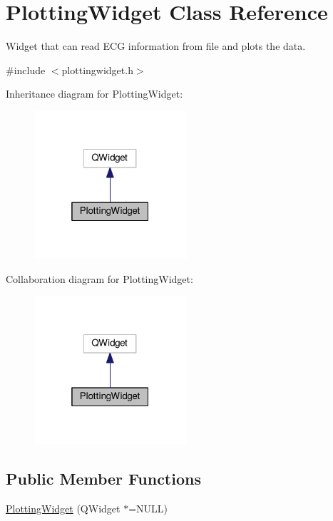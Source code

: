 \hypertarget{classPlottingWidget}{}\section{Plotting\+Widget Class Reference}
\label{classPlottingWidget}


Widget that can read E\+CG information from file and plots the data.  




{\ttfamily \#include $<$plottingwidget.\+h$>$}



Inheritance diagram for Plotting\+Widget\+:\nopagebreak
\begin{figure}[H]
\begin{center}
\leavevmode
\includegraphics[width=160pt]{classPlottingWidget__inherit__graph}
\end{center}
\end{figure}


Collaboration diagram for Plotting\+Widget\+:\nopagebreak
\begin{figure}[H]
\begin{center}
\leavevmode
\includegraphics[width=160pt]{classPlottingWidget__coll__graph}
\end{center}
\end{figure}
\subsection*{Public Member Functions}
\begin{DoxyCompactItemize}
\item 
\hyperlink{classPlottingWidget_a094b0449651206a5d5fbad95489d9a05}{Plotting\+Widget} (Q\+Widget $\ast$=N\+U\+LL)
\end{DoxyCompactItemize}
